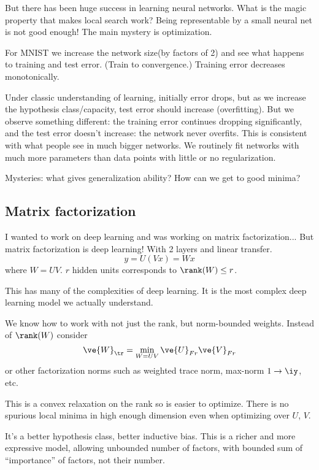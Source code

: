But there has been huge success in learning neural networks. What is the magic property that makes local search work? Being representable by a small neural net is not good enough! The main mystery is optimization.

For MNIST we increase the network size(by factors of 2) and see what happens to training and test error. (Train to convergence.) Training error decreases monotonically. 

Under classic understanding of learning, initially error drops, but as we increase the hypothesis class/capacity,  test error should increase (overfitting). But we observe something different: the training error continues dropping significantly, and the test error doesn't increase: the network never overfits. This is consistent with what people see in much bigger networks. We routinely fit networks with much more parameters than data points with little or no regularization.

Mysteries: what gives generalization ability? How can we get to good minima?

\subsection{Matrix factorization}

I wanted to work on deep learning and was working on matrix factorization...
But matrix factorization is deep learning! With 2 layers and linear transfer. 
$$
y=U(Vx) = Wx
$$
where $W=UV$. $r$ hidden units corresponds to $\rank(W)\le r$.

This has many of the complexities of deep learning. It is the most complex deep learning model we actually understand. 

We know how to work with not just the rank, but norm-bounded weights. Instead of $\rank(W)$ consider 
$$
\ve{W}_{\tr} = \min_{W=UV} \ve{U}_{Fr} \ve{V}_{Fr}
$$
or other factorization norms such as weighted trace norm, max-norm $1\to \iy$, etc.

This is a convex relaxation on the rank so is easier to optimize. There is no spurious local minima in high enough dimension even when optimizing over $U$, $V$.

It's a better hypothesis class, better inductive bias.  This is a richer and more expressive model, allowing unbounded number of factors, with bounded sum of ``importance'' of factors, not their number.

